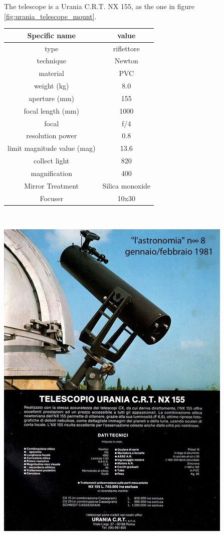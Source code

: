 \documentclass{article}
\begin{document}
\begin{multicols}{2}
        The telescope is a Urania C.R.T. NX 155, as the one in figure \ref{fig:urania_telescope_mount}.
        \\
        \begin{minipage}{0.5\textwidth}
            \centering
            \begin{tabular}{c|c}
                Specific name & value \\
                \hline
                type & riflettore \\
                technique & Newton  \\
                material & PVC  \\
                weight (kg) & 8.0 \\
                aperture (mm) & 155 \\
                focal length (mm) & 1000 \\
                focal & f/4 \\
                resolution power & 0.8 \\
                limit magnitude value (mag) & 13.6 \\
                collect light & 820 \\
                magnification & 400 \\
                Mirror Treatment & Silica monoxide \\
                Focuser & 10x30 \\
                \hline
            \end{tabular}
        \end{minipage}
        \\
        \begin{minipage}{0.5\textwidth}
            \centering
            \includegraphics[scale=0.4]{images/urania_upper.jpg}

\end{minipage}
\end{multicols}
\end{document}
